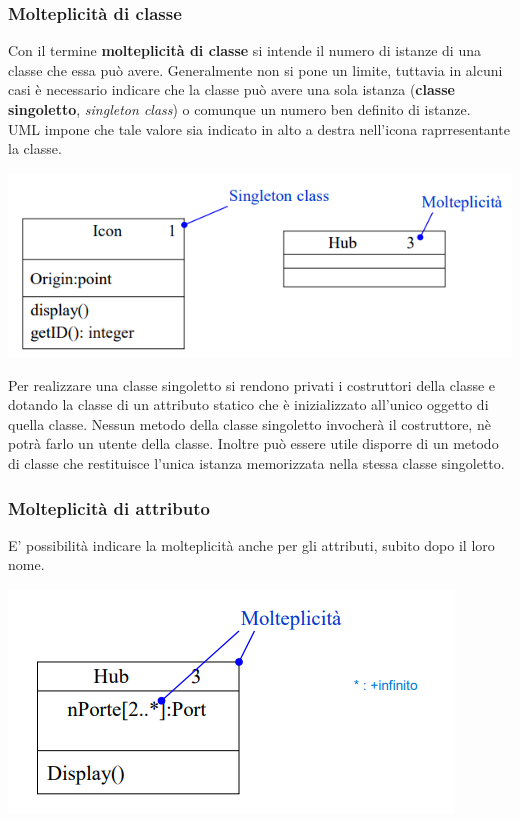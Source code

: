 \documentclass{article}
\begin{document}
	\subsubsection{Molteplicità di classe}
	Con il termine \textbf{molteplicità di classe} si intende il numero di istanze di una classe che essa può avere. Generalmente non si pone un limite, tuttavia in alcuni casi è necessario indicare che la classe può avere una sola istanza (\textbf{classe singoletto}, \textit{singleton class}) o comunque un numero ben definito di istanze.
	\vspace{\baselineskip} \\
	UML impone che tale valore sia indicato in alto a destra nell'icona raprresentante la classe.
	\begin{center}
		\includegraphics[scale=0.6]{assets/uml_molteplicita_classi.png}
	\end{center}
	Per realizzare una classe singoletto si rendono privati i costruttori della classe e dotando la classe di un attributo statico che è inizializzato all'unico oggetto di quella classe. Nessun metodo della classe singoletto invocherà il costruttore, nè potrà farlo un utente della classe. Inoltre può essere utile disporre di un metodo di classe che restituisce l'unica istanza memorizzata nella stessa classe singoletto.

	\subsubsection{Molteplicità di attributo}
	E' possibilità indicare la molteplicità anche per gli attributi, subito dopo il loro nome.
	\begin{center}
		\includegraphics[scale=0.6]{assets/uml_molteplicita_attr.png}
	\end{center}
\end{document}
